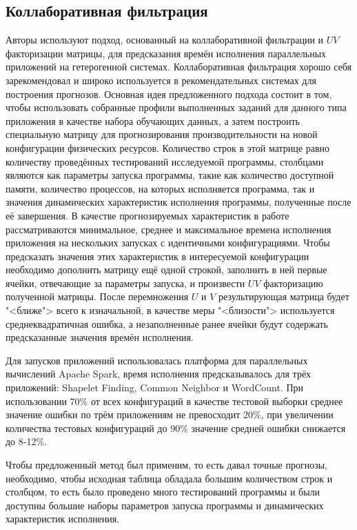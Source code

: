 	\subsection{Коллаборативная фильтрация}
		Авторы \cite{UV_matrix} используют подход, основанный на коллаборативной фильтрации и \(UV\) факторизации матрицы, для предсказания времён исполнения параллельных приложений на гетерогенной системах. Коллаборативная фильтрация хорошо себя зарекомендовал и широко используется в рекомендательных системах для построения прогнозов. Основная идея предложенного подхода состоит в том, чтобы использовать собранные профили выполненных заданий для данного типа приложения в качестве набора обучающих данных, а затем построить специальную матрицу для прогнозирования производительности на новой конфигурации физических ресурсов. Количество строк в этой матрице равно количеству проведённых тестирований исследуемой программы, столбцами являются как параметры запуска программы, такие как количество доступной памяти, количество процессов, на которых исполняется программа, так и значения динамических характеристик исполнения программы, полученные после её завершения. В качестве прогнозируемых характеристик в работе рассматриваются минимальное, среднее и максимальное времена исполнения приложения на нескольких запусках с идентичными конфигурациями. Чтобы предсказать значения этих характеристик в интересуемой конфигурации необходимо дополнить матрицу ещё одной строкой, заполнить в ней первые ячейки, отвечающие за параметры запуска, и произвести \(UV\) факторизацию полученной матрицы. После перемножения \(U\) и \(V\) результирующая матрица будет "<ближе"> всего к изначальной, в качестве меры "<близости"> используется среднеквадратичная ошибка, а незаполненные ранее ячейки будут содержать предсказанные значения времён исполнения.

		Для запусков приложений использовалась платформа для параллельных вычислений Apache Spark, время исполнения предсказывалось для трёх приложений: Shapelet Finding, Common Neighbor и WordCount. При использовании 70\% от всех конфигураций в качестве тестовой выборки среднее значение ошибки по трём приложениям не превосходит 20\%, при увеличении количества тестовых конфигураций до 90\% значение средней ошибки снижается до 8-12\%.

		Чтобы предложенный метод был применим, то есть давал точные прогнозы, необходимо, чтобы исходная таблица обладала большим количеством строк и столбцом, то есть было проведено много тестирований программы и были доступны большие наборы параметров запуска программы и динамических характеристик исполнения.

